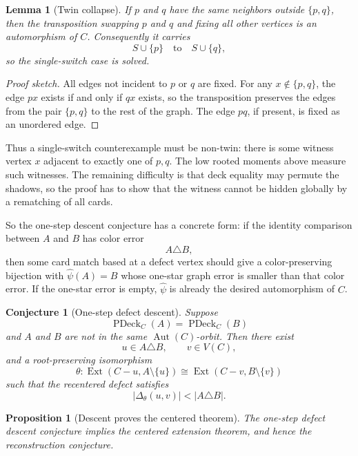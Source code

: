\documentclass[11pt]{article}
\newtheorem{lemma}{Lemma}
\newtheorem{proposition}{Proposition}
\newtheorem{conjecture}{Conjecture}
\newcommand{\PDeck}{\operatorname{PDeck}}
\newcommand{\Ext}{\operatorname{Ext}}
\newcommand{\Aut}{\operatorname{Aut}}
\begin{document}
\begin{lemma}[Twin collapse]
If \(p\) and \(q\) have the same neighbors outside \(\{p,q\}\), then the
transposition swapping \(p\) and \(q\) and fixing all other vertices is an
automorphism of \(C\).  Consequently it carries
\[
  S\cup\{p\}
  \quad\text{to}\quad
  S\cup\{q\},
\]
so the single-switch case is solved.
\end{lemma}

\begin{proof}[Proof sketch]
All edges not incident to \(p\) or \(q\) are fixed.  For any
\(x\notin\{p,q\}\), the edge \(px\) exists if and only if \(qx\) exists, so
the transposition preserves the edges from the pair \(\{p,q\}\) to the rest
of the graph.  The edge \(pq\), if present, is fixed as an unordered edge.
\end{proof}

Thus a single-switch counterexample must be non-twin: there is some witness
vertex \(x\) adjacent to exactly one of \(p,q\).  The low rooted moments above
measure such witnesses.  The remaining difficulty is that deck equality may
permute the shadows, so the proof has to show that the witness cannot be
hidden globally by a rematching of all cards.

So the one-step descent conjecture has a concrete form: if the identity
comparison between \(A\) and \(B\) has color error
\[
  A\triangle B,
\]
then some card match based at a defect vertex should give a color-preserving
bijection with \(\widehat\psi(A)=B\) whose one-star graph error is smaller
than that color error.  If the one-star error is empty, \(\widehat\psi\) is
already the desired automorphism of \(C\).

\begin{conjecture}[One-step defect descent]
Suppose
\[
  \PDeck_C(A)=\PDeck_C(B)
\]
and \(A\) and \(B\) are not in the same \(\Aut(C)\)-orbit.  Then there exist
\[
  u\in A\triangle B,\qquad v\in V(C),
\]
and a root-preserving isomorphism
\[
  \theta:
  \Ext(C-u,A\setminus\{u\})
  \cong
  \Ext(C-v,B\setminus\{v\})
\]
such that the recentered defect satisfies
\[
  |\Delta_\theta(u,v)| < |A\triangle B|.
\]
\end{conjecture}

\begin{proposition}[Descent proves the centered theorem]
The one-step defect descent conjecture implies the centered extension theorem,
and hence the reconstruction conjecture.
\end{proposition}
\end{document}
